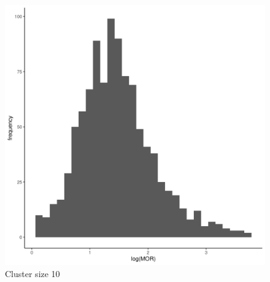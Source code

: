 \documentclass[
  letterpaper,
  DIV=11,
  numbers=noendperiod,
  titlepage]{scrartcl}
\begin{document}
\begin{figure}
\begin{minipage}[t]{0.24\linewidth}
{{\includegraphics{../../plots/two-lvl-ran-int/high-prev/hist_10_10_two_lvl_high_prev.png}

}

\caption{Cluster size 10}

}

\end{minipage}%
%
\begin{minipage}[t]{0.24\linewidth}

{\centering 

}
\end{minipage}
\end{figure}
\end{document}
